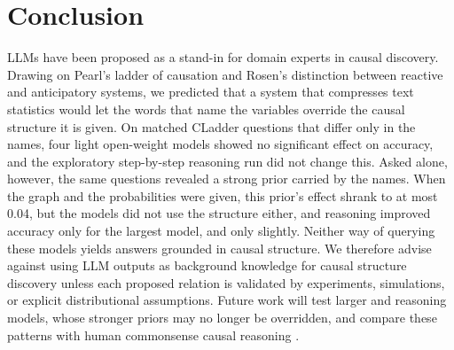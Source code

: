 \documentclass{llncs}
\newif\ifincludeappendix
\begin{document}

\section{Conclusion}
\label{sec:conclusion}

LLMs have been proposed as a stand-in for domain experts in causal discovery. Drawing on Pearl's ladder of causation and Rosen's distinction between reactive and anticipatory systems, we predicted that a system that compresses text statistics would let the words that name the variables override the causal structure it is given. On matched CLadder questions that differ only in the names, four light open-weight models showed no significant effect on accuracy, and the exploratory step-by-step reasoning run did not change this. Asked alone, however, the same questions revealed a strong prior carried by the names. When the graph and the probabilities were given, this prior's effect shrank to at most 0.04, but the models did not use the structure either, and reasoning improved accuracy only for the largest model, and only slightly. Neither way of querying these models yields answers grounded in causal structure. We therefore advise against using LLM outputs as background knowledge for causal structure discovery unless each proposed relation is validated by experiments, simulations, or explicit distributional assumptions. Future work will test larger and reasoning models, whose stronger priors may no longer be overridden, and compare these patterns with human commonsense causal reasoning \cite{penn2007causal}.

%
%


\ifincludeappendix
\appendix

\fi
\end{document}
